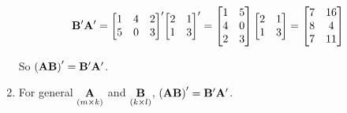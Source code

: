 \begin{enumerate}[label=(\alph*)]
            \[
                \bold{B}^\prime \bold{A}^\prime =
                {\begin{bmatrix}
                    1 & 4 & 2 \\
                    5 & 0 & 3
                \end{bmatrix}}^\prime
                {\begin{bmatrix}
                    2 & 1 \\
                    1 & 3
                \end{bmatrix}}^\prime =
                \begin{bmatrix}
                    1 & 5 \\
                    4 & 0 \\
                    2 & 3
                \end{bmatrix}
                \begin{bmatrix}
                    2 & 1 \\
                    1 & 3
                \end{bmatrix} =
                \begin{bmatrix}
                    7 & 16 \\
                    8 & 4 \\
                    7 & 11
                \end{bmatrix}
            \]

            So ${\left(\bold{AB}\right)}^\prime = \bold{B}^\prime \bold{A}^\prime$.

            \item For general $\underset{\left(m\times k\right)}{\bold{A}}$ and $\underset{\left(k\times l\right)}{\bold{B}}$, ${\left(\bold{AB}\right)}^\prime = \bold{B}^\prime\bold{A}^\prime$.
            

\end{enumerate}
